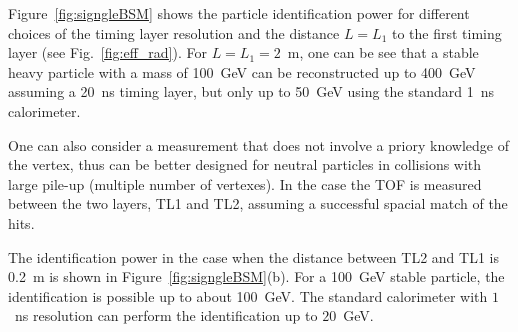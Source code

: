 Figure~\ref{fig:signgleBSM} shows the particle identification power for different choices of the timing layer resolution
and the distance $L=L_1$ to the first timing layer (see Fig.~\ref{fig:eff_rad}).
For $L=L_1=2$~m, one can be see that a stable heavy particle with a mass of 100~GeV can be reconstructed up to 
400~GeV assuming a 20~ns timing layer,
but only up to 50~GeV using the standard 1~ns calorimeter.

One can also consider a  measurement that does not involve a priory knowledge  of the vertex, thus can be better
designed for neutral particles in collisions with large pile-up (multiple number of vertexes).  
In the case the TOF is measured between the two layers, TL1 and TL2, assuming a successful spacial match of the hits.

The identification power in the case when the distance between TL2 and TL1 is 0.2~m is shown in Figure~\ref{fig:signgleBSM}(b).
For a 100~GeV stable particle, the identification is possible up to about 100~GeV. The standard calorimeter with
$1$~ns resolution can perform the identification up to $20$~GeV. 

